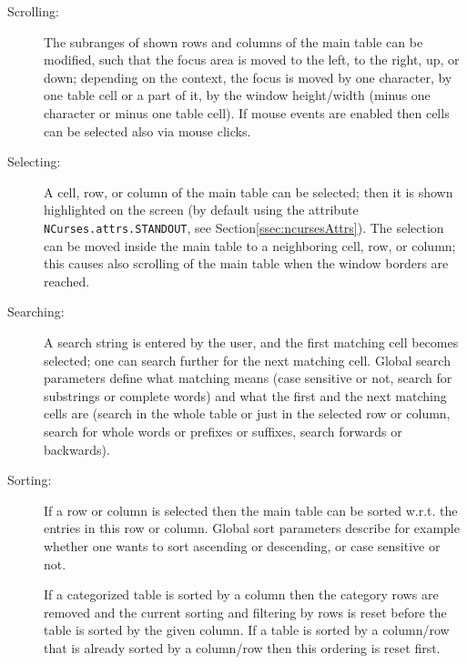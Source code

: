 \documentclass[a4paper,11pt]{report}
\begin{document}
{{ 
\begin{description}
\item[{Scrolling:}]  The subranges of shown rows and columns of the main table can be modified,
such that the focus area is moved to the left, to the right, up, or down;
depending on the context, the focus is moved by one character, by one table
cell or a part of it, by the window height/width (minus one character or minus
one table cell). If mouse events  are enabled then cells can be selected also via mouse clicks. 
\item[{Selecting:}]  A cell, row, or column of the main table can be selected; then it is shown
highlighted on the screen (by default using the attribute \texttt{NCurses.attrs.STANDOUT}, see Section{\nobreakspace}\ref{ssec:ncursesAttrs}). The selection can be moved inside the main table to a neighboring cell,
row, or column; this causes also scrolling of the main table when the window
borders are reached. 
\item[{Searching:}]  A search string is entered by the user, and the first matching cell becomes
selected; one can search further for the next matching cell. Global search
parameters define what matching means (case sensitive or not, search for
substrings or complete words) and what the first and the next matching cells
are (search in the whole table or just in the selected row or column, search
for whole words or prefixes or suffixes, search forwards or backwards). 
\item[{Sorting:}]  If a row or column is selected then the main table can be sorted w.r.t. the
entries in this row or column. Global sort parameters describe for example
whether one wants to sort ascending or descending, or case sensitive or not. 

 If a categorized table is sorted by a column then the category rows are
removed and the current sorting and filtering by rows is reset before the
table is sorted by the given column. If a table is sorted by a column/row that
is already sorted by a column/row then this ordering is reset first. 


\end{description}}}
\end{document}

